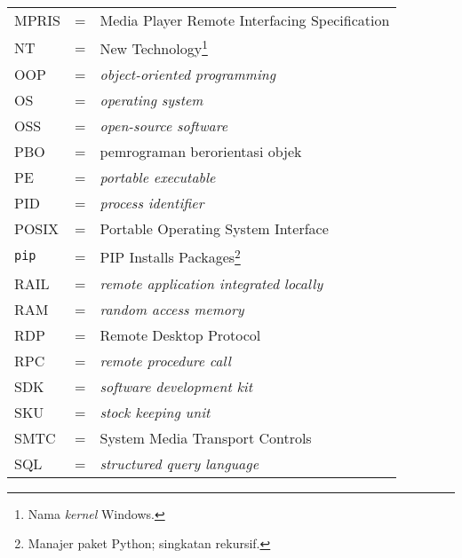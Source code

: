 \begin{longtable}{llp{3in}}
    MPRIS & \hspace{1.5cm} = & Media Player Remote Interfacing Specification\\
    NT & \hspace{1.5cm} = & New Technology\footnote{Nama \textit{kernel} Windows.}\\
    OOP & \hspace{1.5cm} = & \textit{object-oriented programming}\\
    OS & \hspace{1.5cm} = & \textit{operating system}\\
    OSS & \hspace{1.5cm} = & \textit{open-source software}\\
    PBO & \hspace{1.5cm} = & pemrograman berorientasi objek\\
    PE & \hspace{1.5cm} = & \textit{portable executable}\\
    PID & \hspace{1.5cm} = & \textit{process identifier}\\
    POSIX & \hspace{1.5cm} = & Portable Operating System Interface\\
    \verb|pip| & \hspace{1.5cm} = & PIP Installs Packages\footnote{Manajer paket Python; singkatan rekursif.}\\
    RAIL & \hspace{1.5cm} = & \textit{remote application integrated locally}\\
    RAM & \hspace{1.5cm} = & \textit{random access memory}\\
    RDP & \hspace{1.5cm} = & Remote Desktop Protocol\\
    RPC & \hspace{1.5cm} = & \textit{remote procedure call}\\
    SDK & \hspace{1.5cm} = & \textit{software development kit}\\
    SKU & \hspace{1.5cm} = & \textit{stock keeping unit}\\
    SMTC & \hspace {1.5cm} = & System Media Transport Controls\\
    SQL & \hspace{1.5cm} = & \textit{structured query language}\\

\end{longtable}
